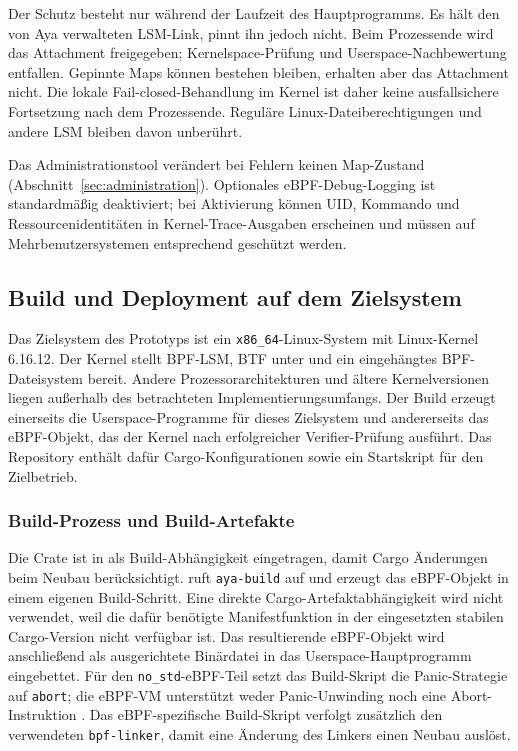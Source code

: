 Der Schutz besteht nur während der Laufzeit des Hauptprogramms. Es hält den von Aya verwalteten LSM-Link, pinnt ihn jedoch nicht. Beim Prozessende wird das Attachment freigegeben; Kernelspace-Prüfung und Userspace-Nachbewertung entfallen. Gepinnte Maps können bestehen bleiben, erhalten aber das Attachment nicht. Die lokale Fail-closed-Behandlung im Kernel ist daher keine ausfallsichere Fortsetzung nach dem Prozessende. Reguläre Linux-Dateiberechtigungen und andere LSM bleiben davon unberührt.

Das Administrationstool verändert bei Fehlern keinen Map-Zustand (Abschnitt~\ref{sec:administration}). Optionales eBPF-Debug-Logging ist standardmäßig deaktiviert; bei Aktivierung können UID, Kommando und Ressourcenidentitäten in Kernel-Trace-Ausgaben erscheinen und müssen auf Mehrbenutzersystemen entsprechend geschützt werden.

\subsection{Build und Deployment auf dem Zielsystem}\label{sec:build-deployment}
Das Zielsystem des Prototyps ist ein \texttt{x86\_64}-Linux-System mit Linux-Kernel 6.16.12. Der Kernel stellt BPF-LSM, BTF unter  und ein eingehängtes BPF-Dateisystem bereit. Andere Prozessorarchitekturen und ältere Kernelversionen liegen außerhalb des betrachteten Implementierungsumfangs. Der Build erzeugt einerseits die Userspace-Programme für dieses Zielsystem und andererseits das eBPF-Objekt, das der Kernel nach erfolgreicher Verifier-Prüfung ausführt. Das Repository enthält dafür Cargo-Konfigurationen sowie ein Startskript für den Zielbetrieb.

\subsubsection{Build-Prozess und Build-Artefakte}
Die Crate  ist in  als Build-Abhängigkeit eingetragen, damit Cargo Änderungen beim Neubau berücksichtigt.  ruft \texttt{aya-build} auf und erzeugt das eBPF-Objekt in einem eigenen Build-Schritt. Eine direkte Cargo-Artefaktabhängigkeit wird nicht verwendet, weil die dafür benötigte Manifestfunktion in der eingesetzten stabilen Cargo-Version nicht verfügbar ist. Das resultierende eBPF-Objekt wird anschließend als ausgerichtete Binärdatei in das Userspace-Hauptprogramm eingebettet. Für den \texttt{no\_std}-eBPF-Teil setzt das Build-Skript die Panic-Strategie auf \texttt{abort}; die eBPF-VM unterstützt weder Panic-Unwinding noch eine Abort-Instruktion \citep{ayaBook}. Das eBPF-spezifische Build-Skript verfolgt zusätzlich den verwendeten \texttt{bpf-linker}, damit eine Änderung des Linkers einen Neubau auslöst.

